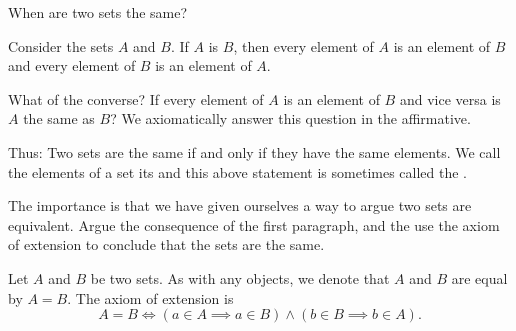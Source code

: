 
\sbasic




\sstart
{}


When are two
sets the same?


Consider the sets
$A$ and $B$.
If $A$ is $B$,
then every element of
$A$ is an element of
$B$ and every element
of $B$ is an element of
$A$.

What of the converse?
If every element of $A$
is an element of $B$
and vice versa is $A$
the same as $B$?
We axiomatically answer
this question in the affirmative.

Thus:
Two sets are
the same if and only
if they have the same
elements.
We call the elements of a set
its  and
this above statement
is sometimes called the
.

The importance is that we have
given ourselves a way to argue
two sets are equivalent. Argue
the consequence of the first
paragraph, and the use the
axiom of extension to conclude
that the sets are the same.


Let $A$ and $B$ be
two sets.
As with any objects,
we denote that
$A$ and $B$
are equal
by $A = B$.
The axiom of extension is
\[
  A = B \Leftrightarrow (a \in A \implies a \in B) \land (b \in B \implies b \in A).
\]
\strats
